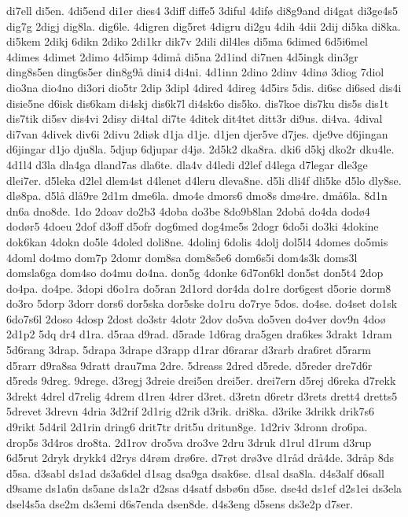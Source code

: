 {di7ell
di5en.
4di5end
di1er
dies4
3diff
diffe5
3diful
4dif^^f8
di8g9and
di4gat
di3ge4s5
dig7g
2digj
dig8la.
dig6le.
4digren
dig5ret
4digru
di2gu
4dih
4dii
2dij
di5ka
di8ka.
di5kem
2dikj
6dikn
2diko
2di1kr
dik7v
2dili
dil4les
di5ma
6dimed
6d5i6mel
4dimes
4dimet
2dimo
4d5imp
4dim^^e5
di5na
2d1ind
di7nen
4d5ingk
din3gr
ding8s5en
ding6s5er
din8g9^^e5
dini4
di4ni.
4d1inn
2dino
2dinv
4din^^f8
3diog
7diol
dio3na
dio4no
di3ori
dio5tr
2dip
3dipl
4dired
4direg
4d5irs
5dis.
di6sc
di6sed
dis4i
disie5ne
d6isk
dis6kam
di4skj
dis6k7l
di4sk6o
dis5ko.
dis7koe
dis7ku
dis5s
dis1t
dis7tik
di5sv
dis4vi
2disy
di4tal
di7te
4ditek
dit4tet
ditt3r
di9us.
di4va.
4dival
di7van
4divek
div6i
2divu
2di^^f8k
d1ja
d1je.
d1jen
djer5ve
d7jes.
dje9ve
d6jingan
d6jingar
d1jo
dju8la.
5djup
6djupar
d4j^^f8.
2d5k2
dka8ra.
dki6
d5kj
dko2r
dku4le.
4d1l4
d3la
dla4ga
dland7as
dla6te.
dla4v
d4ledi
d2lef
d4lega
d7legar
dle3ge
dlei7er.
d5leka
d2lel
dlem4st
d4lenet
d4leru
dleva8ne.
d5li
dli4f
dli5ke
d5lo
dly8se.
dl^^f88pa.
d5l^^e5
dl^^e59re
2d1m
dme6la.
dmo4e
dmors6
dmo8s
dm^^f84re.
dm^^e56la.
8d1n
dn6a
dno8de.
1do
2doav
do2b3
4doba
do3be
8do9b8lan
2dob^^e5
do4da
dod^^f84
dod^^f8r5
4doeu
2dof
d3off
d5ofr
dog6med
dog4me5s
2dogr
6do5i
do3ki
4dokine
dok6kan
4dokn
do5le
4doled
doli8ne.
4dolinj
6dolis
4dolj
dol5l4
4domes
do5mis
4doml
do4mo
dom7p
2domr
dom8sa
dom8s5e6
dom6s5i
dom4s3k
doms3l
domsla6ga
dom4so
do4mu
do4na.
don5g
4donke
6d7on6kl
don5st
don5t4
2dop
do4pa.
do4pe.
3dopi
d6o1ra
do5ran
2d1ord
dor4da
do1re
dor6gest
d5orie
dorm8
do3ro
5dorp
3dorr
dors6
dor5ska
dor5ske
do1ru
do7rye
5dos.
do4se.
do4set
do1sk
6do7s6l
2doso
4dosp
2dost
do3str
4dotr
2dov
do5va
do5ven
do4ver
dov9n
4do^^f8
2d1p2
5dq
dr4
d1ra.
d5raa
d9rad.
d5rade
1d6rag
dra5gen
dra6kes
3drakt
1dram
5d6rang
3drap.
5drapa
3drape
d3rapp
d1rar
d6rarar
d3rarb
dra6ret
d5rarm
d5rarr
d9ra8sa
9dratt
drau7ma
2dre.
5dreass
2dred
d5rede.
d5reder
dre7d6r
d5reds
9dreg.
9drege.
d3regj
3dreie
drei5en
drei5er.
drei7ern
d5rej
d6reka
d7rekk
3drekt
4drel
d7relig
4drem
d1ren
4drer
d3ret.
d3retn
d6retr
d3rets
drett4
dretts5
5drevet
3drevn
4dria
3d2rif
2d1rig
d2rik
d3rik.
dri8ka.
d3rike
3drikk
drik7s6
d9rikt
5d4ril
2d1rin
dring6
drit7tr
drit5u
dritun8ge.
1d2riv
3dronn
dro6pa.
drop5s
3d4ros
dro8ta.
2d1rov
dro5va
dro3ve
2dru
3druk
d1rul
d1rum
d3rup
6d5rut
2dryk
drykk4
d2rys
d4r^^f8m
dr^^f86re.
d7r^^f8t
dr^^f83ve
d1r^^e5d
dr^^e54de.
3dr^^e5p
8ds
d5sa.
d3sabl
ds1ad
ds3a6del
d1sag
dsa9ga
dsak6se.
d1sal
dsa8la.
d4s3alf
d6sall
d9same
ds1a6n
ds5ane
ds1a2r
d2sas
d4satf
dsb^^f86n
d5se.
dse4d
ds1ef
d2s1ei
ds3ela
dsel4s5a
dse2m
ds3emi
d6s7enda
dsen8de.
d4s3eng
d5sens
ds3e2p
d7ser.
}

